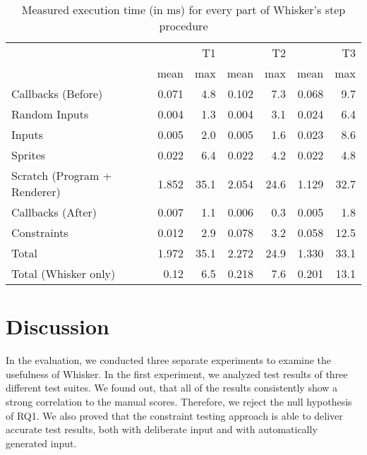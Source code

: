 \begin{table}[htpb]
    \centering
    \footnotesize
    \begin{tabular}{l|rr|rr|rr}
        \toprule
                                     &       & T1   &       & T2   &       & T3   \\
                                     & mean  & max  & mean  & max  & mean  & max  \\
        \midrule
        Callbacks (Before)           & 0.071 & 4.8  & 0.102 & 7.3  & 0.068 & 9.7  \\
        Random Inputs                & 0.004 & 1.3  & 0.004 & 3.1  & 0.024 & 6.4  \\
        Inputs                       & 0.005 & 2.0  & 0.005 & 1.6  & 0.023 & 8.6  \\
        Sprites                      & 0.022 & 6.4  & 0.022 & 4.2  & 0.022 & 4.8  \\
        Scratch (Program + Renderer) & 1.852 & 35.1 & 2.054 & 24.6 & 1.129 & 32.7 \\
        Callbacks (After)            & 0.007 & 1.1  & 0.006 & 0.3  & 0.005 & 1.8  \\
        Constraints                  & 0.012 & 2.9  & 0.078 & 3.2  & 0.058 & 12.5 \\
        \midrule
        Total                        & 1.972 & 35.1 & 2.272 & 24.9 & 1.330 & 33.1 \\
        Total (Whisker only)         & 0.12  & 6.5  & 0.218 & 7.6  & 0.201 & 13.1 \\
        \bottomrule
    \end{tabular}
    \caption{Measured execution time (in ms) for every part of Whisker's step procedure}
    \label{tab:time_measurements}
\end{table}

\section{Discussion}
\label{sec:discussion}

In the evaluation, we conducted three separate experiments to examine the usefulness of Whisker.
In the first experiment, we analyzed test results of three different test suites.
We found out, that all of the results consistently show a strong correlation to the manual scores.
Therefore, we reject the null hypothesis of RQ1.
We also proved that the constraint testing approach is able to deliver accurate test results,
both with deliberate input and with automatically generated input.
\parspace

